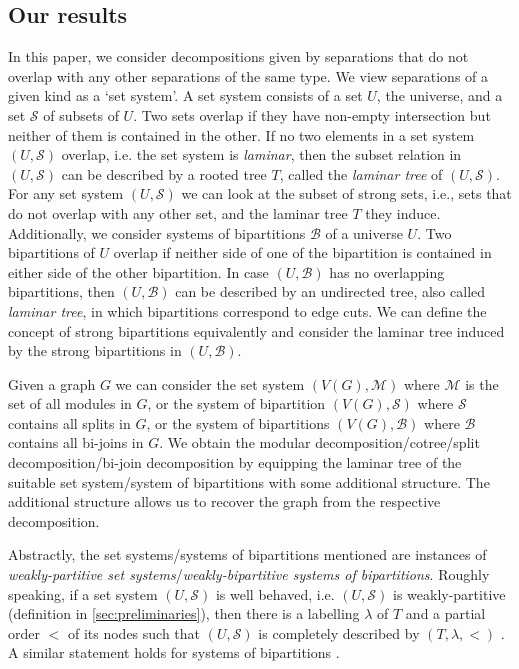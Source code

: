 \documentclass{lmcs} %
\begin{document}
\subsection{Our results}
In this paper,
we consider decompositions given by separations that do not overlap with any other separations of the same type.
We view separations of a given kind as a `set system'.
A set system consists of a set $U$, the universe, and a set $\mathcal{S}$ of subsets of $U$. Two sets overlap if they have non-empty intersection but neither of them is contained in the other. If no two elements in a set system $(U,\mathcal{S})$ overlap, i.e. the set system is \emph{laminar}, then the subset relation in $(U,\mathcal{S})$ can be described by a rooted tree $T$, called the \emph{laminar tree} of $(U,\mathcal{S})$.
For any set system $(U, \mathcal{S})$ we can look at the subset of strong sets, i.e., sets that do not overlap with any other set, and the laminar tree $T$ they induce. Additionally, we consider systems of bipartitions $\mathcal{B}$ of a universe $U$. Two bipartitions of $U$ overlap if neither side of one of the bipartition is contained in either side of the other bipartition. In case $(U,\mathcal{B})$ has no overlapping bipartitions, then $(U,\mathcal{B})$ can be described by an undirected tree, also called \emph{laminar tree}, in which bipartitions correspond to edge cuts. We can define the concept of strong bipartitions equivalently and consider the laminar tree induced by the strong bipartitions in $(U,\mathcal{B})$.

Given a graph $G$ we can consider the set system $(V(G),\mathcal{M})$ where $\mathcal{M}$ is the set of all modules in $G$, or the system of bipartition $(V(G),\mathcal{S})$ where $\mathcal{S}$ contains all splits in $G$, or the system of bipartitions $(V(G),\mathcal{B})$ where $\mathcal{B}$ contains all bi-joins in $G$. We obtain the modular decomposition/cotree/split decomposition/bi-join decomposition by equipping the laminar tree of the suitable set system/system of bipartitions with some additional structure. The additional structure allows us to recover the graph from the respective decomposition.

Abstractly, the set systems/systems of bipartitions mentioned are instances of \emph{weakly-partitive set systems}/\emph{weakly-bipartitive systems of bipartitions}.
Roughly speaking, if a set system $(U,\mathcal{S})$ is well behaved, i.e. $(U,\mathcal{S})$ is weakly-partitive (definition in \autoref{sec:preliminaries}), then there is a labelling $\lambda$ of $T$ and a partial order $<$ of its nodes such that $(U,\mathcal{S})$ is completely described by $(T,\lambda,<)$ \cite{chein1981partitive,raoThesis}. A similar statement holds for systems of bipartitions \cite{montgolfierThesis}.
\end{document}
